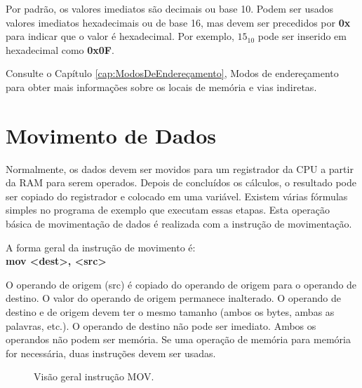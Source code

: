 Por padrão, os valores imediatos são decimais ou base 10. Podem ser usados valores imediatos hexadecimais ou de base 16, mas devem ser precedidos por \textbf{0x} para indicar que o valor é hexadecimal. Por exemplo, $ 15_{10} $ pode ser inserido em hexadecimal como \textbf{0x0F}.

Consulte o Capítulo \ref{cap:ModosDeEndereçamento}, Modos de endereçamento para obter mais informações sobre os locais de memória e vias indiretas.

\section{Movimento de Dados}
Normalmente, os dados devem ser movidos para um registrador da CPU a partir da RAM para serem operados. Depois de concluídos os cálculos, o resultado pode ser copiado do registrador e colocado em uma variável. Existem várias fórmulas simples no programa de exemplo que executam essas etapas. Esta operação básica de movimentação de dados é realizada com a instrução de movimentação.

A forma geral da instrução de movimento é:\\
\textbf{mov <dest>, <src>}

O operando de origem (src) é copiado do operando de origem para o operando de destino. O valor do operando de origem permanece inalterado. O operando de destino e de origem devem ter o mesmo tamanho (ambos os bytes, ambas as palavras, etc.). O operando de destino não pode ser imediato. Ambos os operandos não podem ser memória. Se uma operação de memória para memória for necessária, duas instruções devem ser usadas.

\begin{figure}[h]
\begin{center}
\end{center}
	\caption{Visão geral instrução MOV.}
\end{figure}

